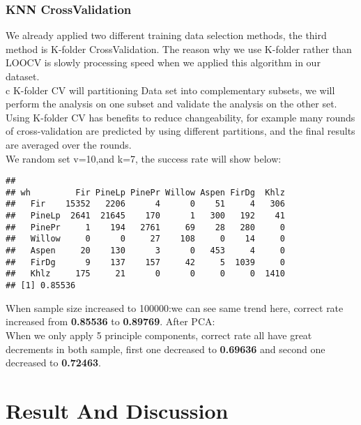 \documentclass{article}\usepackage[]{graphicx}\usepackage[]{color}
\makeatletter
\newenvironment{kframe}{%
 \def\at@end@of@kframe{}%
 \ifinner\ifhmode%
  \def\at@end@of@kframe{\end{minipage}}%
  \begin{minipage}{\columnwidth}%
 \fi\fi%
 \def\FrameCommand##1{\hskip\@totalleftmargin \hskip-\fboxsep
 \colorbox{shadecolor}{##1}\hskip-\fboxsep
     \hskip-\linewidth \hskip-\@totalleftmargin \hskip\columnwidth}%
 \MakeFramed {\advance\hsize-\width
   \@totalleftmargin\z@ \linewidth\hsize
   \@setminipage}}%
 {\par\unskip\endMakeFramed%
 \at@end@of@kframe}
\newenvironment{knitrout}{}{} %
\makeatother
\begin{document}
	\subsubsection{KNN CrossValidation}
	\noindent	We already applied two different training data selection methods, the third method is K-folder CrossValidation. The reason why we use K-folder rather than LOOCV is slowly processing speed when we applied this algorithm in our dataset.\\
c	\noindnet	K-folder CV will partitioning Data set into complementary subsets, we will perform the analysis on one subset and validate the analysis on the other set.
	Using K-folder CV has benefits to reduce changeability, for example many rounds of cross-validation are predicted by using different partitions, and the final results are averaged over the rounds.\\
	\noindent	 We random set v=10,and k=7, the success rate will show below:\\
\begin{knitrout}
\color{fgcolor}\begin{kframe}
\begin{verbatim}
##         
## wh         Fir PineLp PinePr Willow Aspen FirDg  Khlz
##   Fir    15352   2206      4      0    51     4   306
##   PineLp  2641  21645    170      1   300   192    41
##   PinePr     1    194   2761     69    28   280     0
##   Willow     0      0     27    108     0    14     0
##   Aspen     20    130      3      0   453     4     0
##   FirDg      9    137    157     42     5  1039     0
##   Khlz     175     21      0      0     0     0  1410
## [1] 0.85536
\end{verbatim}
\end{kframe}
\end{knitrout}
	\noindent When sample size increased to 100000:we can see same trend here, correct rate increased from \textbf{0.85536} to \textbf{0.89769}.
	After PCA:\\
	When we only apply 5 principle components, correct rate all have great decrements in both sample, first one decreased to \textbf{0.69636} and second one decreased to \textbf{0.72463}.\\


	\section{Result And Discussion}
\end{document}
